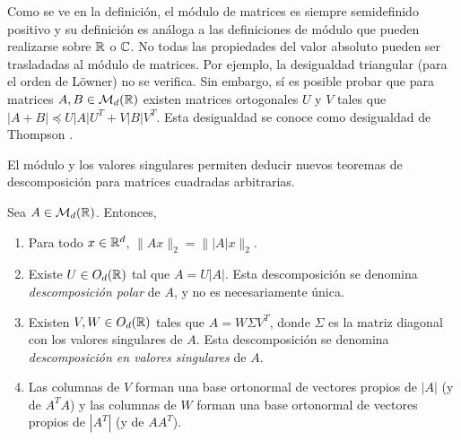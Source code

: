 Como se ve en la definición, el módulo de matrices es siempre semidefinido positivo y su definición es análoga a las definiciones de módulo que pueden realizarse sobre $\mathbb{R}$ o $\mathbb{C}$. No todas las propiedades del valor absoluto pueden ser trasladadas al módulo de matrices. Por ejemplo, la desigualdad triangular (para el orden de Löwner) no se verifica. Sin embargo, sí es posible probar que para matrices $A, B \in \mathcal{M}_d(\mathbb{R})$ existen matrices ortogonales $U$ y $V$ tales que $|A+B| \preceq U|A|U^T + V|B|V^T$. Esta desigualdad se conoce como desigualdad de Thompson \cite{thompson_inequality}.

El módulo y los valores singulares permiten deducir nuevos teoremas de descomposición para matrices cuadradas arbitrarias.

\begin{thm} \label{thm:polar_svd}
    Sea $A \in \mathcal{M}_d(\mathbb{R})$. Entonces,
    \begin{enumerate}
        \item Para todo $x \in \mathbb{R}^d$, $\| Ax\|_2 = \| |A| x\|_2$.
        \item Existe $U \in O_d(\mathbb{R})$ tal que $A = U|A|$. Esta descomposición se denomina \emph{descomposición polar} de $A$, y no es necesariamente única.
        \item Existen $V,W \in O_d(\mathbb{R})$ tales que $A = W\Sigma V^T$, donde $\Sigma$ es la matriz diagonal con los valores singulares de $A$. Esta descomposición se denomina \emph{descomposición en valores singulares} de $A$.
        \item Las columnas de $V$ forman una base ortonormal de vectores propios de $|A|$ (y de $A^TA$) y las columnas de $W$ forman una base ortonormal de vectores propios de $|A^T|$ (y de $AA^T$).
    \end{enumerate} 
\end{thm}

